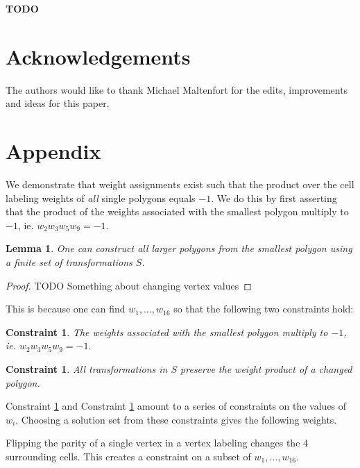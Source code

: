 \documentclass[12pt]{article}
\theoremstyle{plain}
\newtheorem{lemma}[thm]{Lemma}
\newtheorem{constraint}[thm]{Constraint}
\theoremstyle{definition}
\theoremstyle{remark}
\theoremstyle{definition}
\begin{document}
\textbf{TODO}

\section{Acknowledgements}

The authors would like to thank Michael Maltenfort for the edits, improvements and ideas for this paper. 

\printbibliography


\section{Appendix}

We demonstrate that weight assignments exist such that the product over the cell labeling weights of \textit{all} single polygons equals $-1$. We do this by first asserting that the product of the weights associated with the smallest polygon multiply to $-1$, ie. $w_2 w_3 w_5 w_9 = -1$. 

\begin{lemma}\label{lemma: build bigger saps}
    One can construct all larger polygons from the smallest polygon using a finite set of transformations $S$.
\end{lemma}

\begin{proof}
    TODO Something about changing vertex values
\end{proof}

This is because one can find $w_{1} , \dots, w_{16}$ so that the following two constraints hold:

\begin{constraint}\label{constraint: smallest sap prod}
    The weights associated with the smallest polygon multiply to $-1$, ie. $w_2 w_3 w_5 w_9 = -1.$ 
\end{constraint}

\begin{constraint}\label{constraint: prod works}
    All transformations in $S$ preserve the weight product of a changed polygon.
\end{constraint}

Constraint \ref{constraint: smallest sap prod} and Constraint \ref{constraint: prod works} amount to a series of constraints on the values of $w_i$. Choosing a solution set from these constraints gives the following weights.

Flipping the parity of a single vertex in a vertex labeling changes the $4$ surrounding cells. This creates a constraint on a subset of $w_1 ,\dots, w_{16}.$ 
\end{document}
